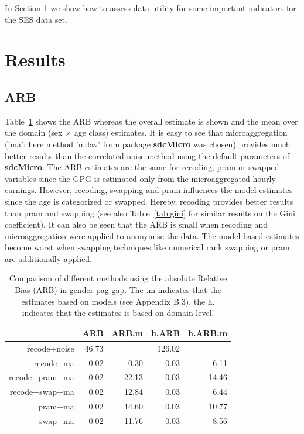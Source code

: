 \documentclass[12pt]{article}
\newcommand{\pkg}[1]{\textbf{#1}}
\begin{document}
In Section \ref{sec:results} we show how to assess data utility for some
important indicators for the SES data set. 

\section{Results} \label{sec:results}


\subsection{ARB}
Table~\ref{tab:gpg} shows the ARB whereas the overall
estimate is shown and the mean over the domain (sex $\times$ age class) estimates.
It is easy to see that microaggregation ('ma'; here method 'mdav' from package \pkg{sdcMicro} \cite{sdcMicro,Templ08tdp} was chosen) 
provides much better
results than the correlated noise method \cite{Brand04} using the default parameters of \pkg{sdcMicro}. 
The ARB estimates are the same for recoding, pram or swapped variables since the 
GPG is estimated only from the microaggregated 
hourly earnings. However, recoding, swapping and pram influences 
the model estimates since the age is categorized or swapped.
Hereby, recoding provides better results than pram and swapping (see also Table~\ref{tab:gini} 
for similar results on the Gini coefficient). It can also be seen that the ARB is small when recoding and microaggregation
were applied to anonymise the data. The model-based estimates become worst when swapping techniques like numerical rank swapping 
or pram are additionally applied.


\begin{table}[ht]
\begin{center}
\caption{\label{tab:gpg}Comparison of different methods using the absolute Relative Bias (ARB) in gender pag gap. 
The .m indicates that the estimates based on models (see Appendix B.3), the h. indicates that the estimates is based on domain level.\vspace{0.2cm}}
\begin{tabular}{rrrrr}
  \hline
 & ARB & ARB.m & h.ARB & h.ARB.m \\ 
  \hline
recode+noise & 46.73 &  & 126.02 &  \\ 
  recode+ma & 0.02 & 0.30 & 0.03 & 6.11 \\ 
  recode+pram+ma & 0.02 & 22.13 & 0.03 & 14.46 \\ 
  recode+swap+ma & 0.02 & 12.84 & 0.03 & 6.44 \\ 
  pram+ma & 0.02 & 14.60 & 0.03 & 10.77 \\ 
  swap+ma & 0.02 & 11.76 & 0.03 & 8.56 \\ 
   \hline
\end{tabular}
\end{center}
\end{table}
\end{document}
